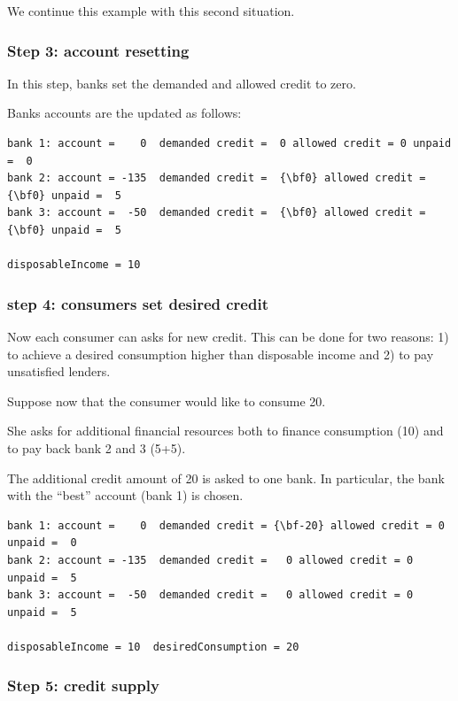 \documentclass{book}
\begin{document}
We continue this example with this second situation.

\subsubsection*{Step 3: account resetting}
In this step, banks set the demanded and allowed credit to zero.

Banks accounts are the updated as follows:

\begin{Verbatim}[commandchars=\\\{\}]
bank 1: account =    0  demanded credit =  0 allowed credit = 0 unpaid =  0
bank 2: account = -135  demanded credit =  {\bf0} allowed credit = {\bf0} unpaid =  5
bank 3: account =  -50  demanded credit =  {\bf0} allowed credit = {\bf0} unpaid =  5

disposableIncome = 10
\end{Verbatim}




\subsubsection*{step 4: consumers set desired credit}
Now each consumer can asks for new credit. This can be done for two reasons: 1) to achieve a desired consumption higher than disposable income and 2) to pay unsatisfied lenders.

Suppose now that the consumer would like to consume 20.

She asks for additional financial resources both to finance consumption (10) and to pay back bank 2 and 3 (5+5).

The additional credit amount of 20 is asked to one bank. In particular, the bank with the ``best'' account (bank 1) is chosen. 

\begin{Verbatim}[commandchars=\\\{\}]
bank 1: account =    0  demanded credit = {\bf-20} allowed credit = 0 unpaid =  0
bank 2: account = -135  demanded credit =   0 allowed credit = 0 unpaid =  5
bank 3: account =  -50  demanded credit =   0 allowed credit = 0 unpaid =  5

disposableIncome = 10  desiredConsumption = 20
\end{Verbatim}


\subsubsection*{Step 5: credit supply}
\end{document}
